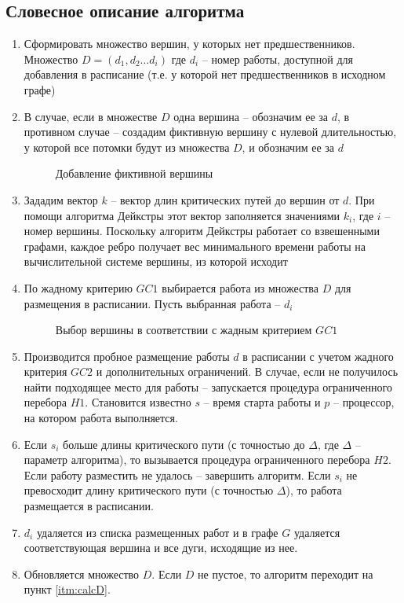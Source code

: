 \subsection{Словесное описание алгоритма}
\begin{enumerate}
    \item Сформировать множество вершин, у которых нет предшественников. Множество $D = \left( d_1, d_2 \dots d_i \right)$ где $d_i$ – номер работы, доступной для добавления в расписание (т.е. у которой нет предшественников в исходном графе)
    \item В случае, если в множестве $D$ одна вершина – обозначим ее за $d$, в противном случае – создадим фиктивную вершину с нулевой длительностью, у которой все потомки будут из множества $D$, и обозначим ее за $d$
    \begin{figure}[H]
        \caption{Добавление фиктивной вершины}
    \end{figure}
    \item Зададим вектор $k$ – вектор длин критических путей до вершин от $d$. При помощи алгоритма Дейкстры этот вектор заполняется значениями $k_i$, где $i$ – номер вершины. Поскольку алгоритм Дейкстры работает со взвешенными графами, каждое ребро получает вес минимального времени работы на вычислительной системе вершины, из которой исходит
    \item \label{itm:calcD} По жадному критерию $GC1$ выбирается работа из множества $D$ для размещения в расписании. Пусть выбранная работа – $d_i$
    \begin{figure}[H]
        \caption{Выбор вершины в соответствии с жадным критерием $GC1$}
    \end{figure}
    \item Производится пробное размещение работы $d$ в расписании с учетом жадного критерия $GC2$ и дополнительных ограничений. В случае, если не получилось найти подходящее место для работы – запускается процедура ограниченного перебора $H1$. Становится известно $s$ – время старта работы и $p$ – процессор, на котором работа выполняется.
    \item Если $s_i$ больше длины критического пути (с точностью до $\Delta$, где $\Delta$ – параметр алгоритма), то вызывается процедура ограниченного перебора $H2$. Если работу разместить не удалось – завершить алгоритм. Если $s_i$ не превосходит длину критического пути (с точностью $\Delta$), то работа размещается в расписании.
    \item $d_i$ удаляется из списка размещенных работ и в графе $G$ удаляется соответствующая вершина и все дуги, исходящие из нее.
    \item Обновляется множество $D$. Если $D$ не пустое, то алгоритм переходит на пункт \ref{itm:calcD}.
\end{enumerate}
